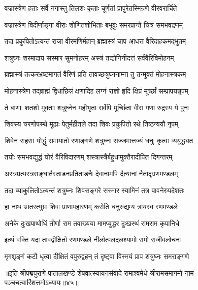 \twolineshloka
{वज्रास्त्रेण हताः सर्वे नगास्तु तिलशः कृताः}
{चूर्णतां प्रापुरेतस्मिन्रणे वीरवरार्चिते}%

\twolineshloka
{वज्रास्त्रेण विदीर्णाङ्गा वीराः शोणितशोभिताः}
{बभूवुः समरप्रान्ते चित्रं समभवद्रणम्}%

\twolineshloka
{तदा प्रकुपितोऽत्यन्तं राजा वीरमणिर्महान्}
{ब्रह्मास्त्रं चाप आधत्त वैरिदाहकमद्भुतम्}%

\twolineshloka
{शत्रुघ्नः शरमादाय सस्मार सुमनोहरम्}
{अस्त्रं तद्योगिनीदत्तं सर्ववैरिविमोहनम्}%

\twolineshloka
{ब्रह्मास्त्रं तत्करभ्रष्टमागतं वैरिणं प्रति}
{तावच्छत्रुघ्ननाम्ना तु तन्मुक्तं मोहनास्त्रकम्}%

\twolineshloka
{मोहनास्त्रेण तद्ब्राह्मं द्विधाछिन्नं क्षणादिह}
{लग्नं राज्ञो हृदि क्षिप्रं मूर्च्छां सम्प्रापयन्नृपम्}%

\twolineshloka
{ते बाणाः शतशो मुक्ताः शत्रुघ्नेन महीभृता}
{सर्वेपि मूर्च्छिता वीरा गणा रुद्रस्य ये पुनः}%

\twolineshloka
{शिवस्य चरणोपस्थे मूढाः पेतुर्महीतले}
{तदा शिवः प्रकुपितो रथे तिष्ठन्ययौ नृपम्}%

\twolineshloka
{शिवेन सहसा योद्धुं समायातो रणाङ्गणे}
{शत्रुघ्नः सज्जमात्तज्यं धनुः कृत्वा व्ययुद्ध्यत}%

\twolineshloka
{तयोः समभवद्युद्धं घोरं वैरिविदारणम्}
{शस्त्रास्त्रैर्बहुधामुक्तैरादीपित दिगन्तरम्}%

\twolineshloka
{अस्त्रप्रत्यस्त्रसङ्घातैस्ताडनप्रतिताडनैः}
{देवानामपि दैत्यानां नैतादृग्रणमण्डलम्}%

\twolineshloka
{तदा व्याकुलितोऽत्यन्तं शत्रुघ्नः शिवसङ्गरे}
{सस्मार स्वामिनं तत्र पावनेरुपदेशतः}%

\twolineshloka
{हा नाथ भ्रातरत्युग्रः शिवः प्राणापहारणम्}
{करोति धनुरुद्यम्य त्रायस्व रणमण्डले}%

\twolineshloka
{अनेके दुःखपाथोधिं तीर्णा राम तवाख्यया}
{मामप्युद्धर दुःखस्थं रामराम कृपानिधे}%

\twolineshloka
{इत्थं वक्ति यदा तावद्वीक्षितो रणमण्डले}
{नीलोत्पलदलश्यामो रामो राजीवलोचनः}%

\twolineshloka
{मृगशृङ्गं कटौ धृत्वा दीक्षितं वपुरुद्वहन्}
{तं दृष्ट्वा विस्मयं प्राप शत्रुघ्नः समराङ्गणे}%

॥इति श्रीपद्मपुराणे पातालखण्डे शेषवात्स्यायनसंवादे रामाश्वमेधे श्रीरामसमागमो नाम पञ्चचत्वारिंशत्तमोऽध्यायः॥४५॥



